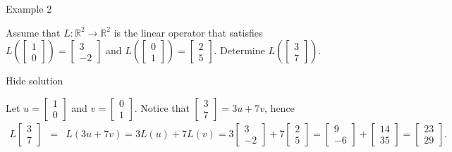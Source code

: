 Example 2

Assume that \( L:\mathbb R^2\to\mathbb R^2 \) is the linear operator that satisfies \( L\left(\left[\begin{array}{c}1\\0\end{array}\right]\right)=\left[\begin{array}{c}3\\-2\end{array}\right]\) and \( L\left(\left[\begin{array}{c}0\\1\end{array}\right]\right)=\left[\begin{array}{c}2\\5\end{array}\right]\). Determine \( L\left(\left[\begin{array}{c}3\\7\end{array}\right]\right)\).

Hide solution

Let \( u=\left[\begin{array}{c}1\\0\end{array}\right]\) and \( v=\left[\begin{array}{c}0\\1\end{array}\right]\). Notice that \( \left[\begin{array}{c}3\\7\end{array}\right]=3u+7v \), hence \begin{eqnarray*}L\left[\begin{array}{c}3\\7\end{array}\right]&=&L(3u+7v)=3L(u)+7L(v)=3\left[\begin{array}{c}3\\-2\end{array}\right]+7\left[\begin{array}{c}2\\5\end{array}\right]=\left[\begin{array}{c}9\\-6\end{array}\right]+ \left[\begin{array}{c}14\\35\end{array}\right]=\left[\begin{array}{c}23\\29\end{array}\right]. \end{eqnarray*}

